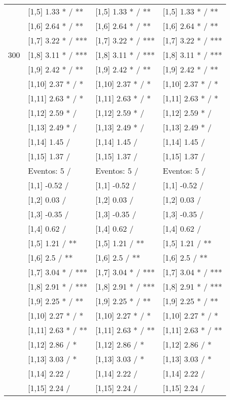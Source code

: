\begin{table}
\begin{tabular}[t]{llll}
 & {}[1,5] 1.33 * / ** & {}[1,5] 1.33 * / ** & {}[1,5] 1.33 * / **\\
 & {}[1,6] 2.64 * / ** & {}[1,6] 2.64 * / ** & {}[1,6] 2.64 * / **\\
 & {}[1,7] 3.22 * / *** & {}[1,7] 3.22 * / *** & {}[1,7] 3.22 * / ***\\
300 & {}[1,8] 3.11 * / *** & {}[1,8] 3.11 * / *** & {}[1,8] 3.11 * / ***\\
\addlinespace
 & {}[1,9] 2.42 * / ** & {}[1,9] 2.42 * / ** & {}[1,9] 2.42 * / **\\
 & {}[1,10] 2.37 * / * & {}[1,10] 2.37 * / * & {}[1,10] 2.37 * / *\\
 & {}[1,11] 2.63 * / * & {}[1,11] 2.63 * / * & {}[1,11] 2.63 * / *\\
 & {}[1,12] 2.59 * / & {}[1,12] 2.59 * / & {}[1,12] 2.59 * /\\
 & {}[1,13] 2.49 * / & {}[1,13] 2.49 * / & {}[1,13] 2.49 * /\\
\addlinespace
 & {}[1,14] 1.45  / & {}[1,14] 1.45  / & {}[1,14] 1.45  /\\
 & {}[1,15] 1.37  / & {}[1,15] 1.37  / & {}[1,15] 1.37  /\\
 & Eventos:  5 / & Eventos:  5 / & Eventos:  5 /\\
 & {}[1,1] -0.52  / & {}[1,1] -0.52  / & {}[1,1] -0.52  /\\
 & {}[1,2] 0.03  / & {}[1,2] 0.03  / & {}[1,2] 0.03  /\\
\addlinespace
 & {}[1,3] -0.35  / & {}[1,3] -0.35  / & {}[1,3] -0.35  /\\
 & {}[1,4] 0.62  / & {}[1,4] 0.62  / & {}[1,4] 0.62  /\\
 & {}[1,5] 1.21  / ** & {}[1,5] 1.21  / ** & {}[1,5] 1.21  / **\\
 & {}[1,6] 2.5  / ** & {}[1,6] 2.5  / ** & {}[1,6] 2.5  / **\\
 & {}[1,7] 3.04 * / *** & {}[1,7] 3.04 * / *** & {}[1,7] 3.04 * / ***\\
\addlinespace
500 & {}[1,8] 2.91 * / *** & {}[1,8] 2.91 * / *** & {}[1,8] 2.91 * / ***\\
 & {}[1,9] 2.25 * / ** & {}[1,9] 2.25 * / ** & {}[1,9] 2.25 * / **\\
 & {}[1,10] 2.27 * / * & {}[1,10] 2.27 * / * & {}[1,10] 2.27 * / *\\
 & {}[1,11] 2.63 * / ** & {}[1,11] 2.63 * / ** & {}[1,11] 2.63 * / **\\
 & {}[1,12] 2.86  / * & {}[1,12] 2.86  / * & {}[1,12] 2.86  / *\\
\addlinespace
 & {}[1,13] 3.03  / * & {}[1,13] 3.03  / * & {}[1,13] 3.03  / *\\
 & {}[1,14] 2.22  / & {}[1,14] 2.22  / & {}[1,14] 2.22  /\\
 & {}[1,15] 2.24  / & {}[1,15] 2.24  / & {}[1,15] 2.24  /\\
\bottomrule
\end{tabular}
\end{table}
